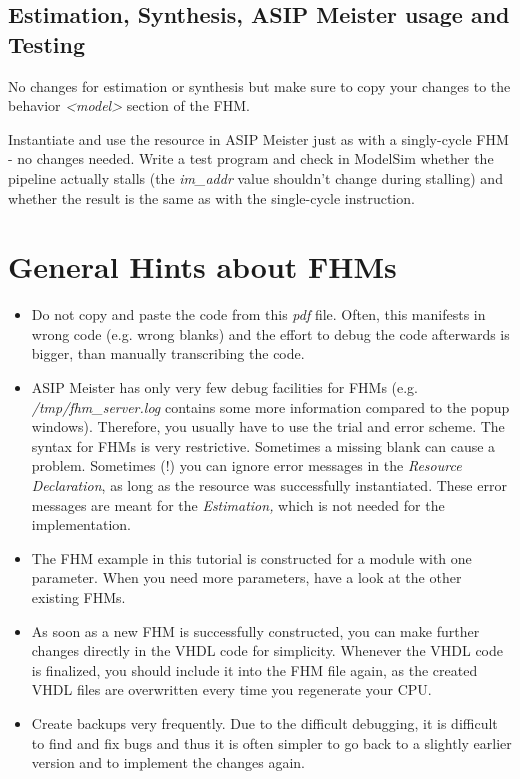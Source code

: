 \hypertarget{estimation-synthesis-asip-meister-usage-and-testing}{%
\subsection{Estimation, Synthesis, ASIP Meister usage and
Testing}\label{estimation-synthesis-asip-meister-usage-and-testing}}

No changes for estimation or synthesis but make sure to copy your
changes to the behavior \emph{\textless model\textgreater{}} section of
the FHM.

Instantiate and use the resource in ASIP Meister just as with a
singly-cycle FHM - no changes needed. Write a test program and check in
ModelSim whether the pipeline actually stalls (the \emph{im\_addr} value
shouldn't change during stalling) and whether the result is the same as
with the single-cycle instruction.

\hypertarget{general-hints-about-fhms}{%
\section{General Hints about FHMs}\label{general-hints-about-fhms}}

\begin{itemize}
\item
  Do not copy and paste the code from this \emph{pdf} file. Often, this
  manifests in wrong code (e.g. wrong blanks) and the effort to debug
  the code afterwards is bigger, than manually transcribing the code.
\item
  ASIP Meister has only very few debug facilities for FHMs (e.g.
  \emph{/tmp/fhm\_server.log} contains some more information compared to
  the popup windows). Therefore, you usually have to use the trial and
  error scheme. The syntax for FHMs is very restrictive. Sometimes a
  missing blank can cause a problem. Sometimes (!) you can ignore error
  messages in the \emph{Resource Declaration}, as long as the resource
  was successfully instantiated. These error messages are meant for the
  \emph{Estimation,} which is not needed for the implementation.
\item
  The FHM example in this tutorial is constructed for a module with one
  parameter. When you need more parameters, have a look at the other
  existing FHMs.
\item
  As soon as a new FHM is successfully constructed, you can make further
  changes directly in the VHDL code for simplicity. Whenever the VHDL
  code is finalized, you should include it into the FHM file again, as
  the created VHDL files are overwritten every time you regenerate your
  CPU.
\item
  Create backups very frequently. Due to the difficult debugging, it is
  difficult to find and fix bugs and thus it is often simpler to go back
  to a slightly earlier version and to implement the changes again.
\end{itemize}


